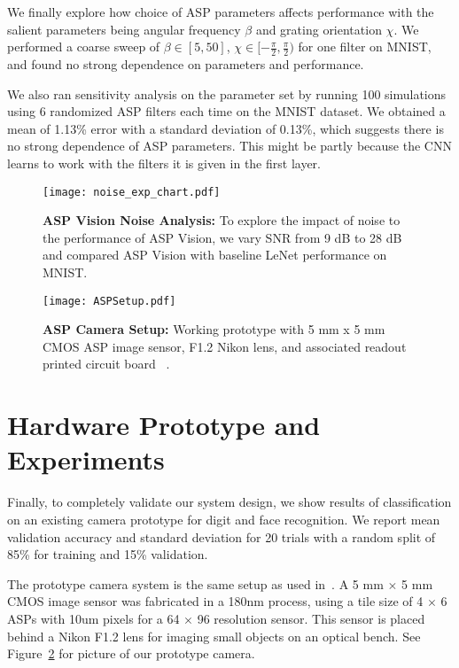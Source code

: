 \documentclass[10pt,twocolumn,letterpaper]{article}
\newcommand{\Section}[1]{\vspace{-4pt}\section{#1}\vspace{-4pt}}
\begin{document}
We finally explore how choice of ASP parameters affects performance with the salient parameters being angular frequency $\beta$ and grating orientation $\chi$. We performed a coarse sweep of $\beta \in [5, 50]$, $\chi \in [-\frac{\pi}{2}, \frac{\pi}{2})$ for one filter on MNIST, and found no strong dependence on parameters and performance. 

We also ran sensitivity analysis on the parameter set by running 100 simulations using 6 randomized ASP filters each time on the MNIST dataset. We obtained a mean of 1.13\% error with a standard deviation of 0.13\%, which suggests there is no strong dependence of ASP parameters. This might be partly because the CNN learns to work with the filters it is given in the first layer.  






\begin{figure}[t]
\begin{center}
   \texttt{[image: noise\_exp\_chart.pdf]}
\end{center}
   \caption{\textbf{ASP Vision Noise Analysis:} To explore the impact of noise to the performance of ASP Vision, we vary SNR from 9 dB to 28 dB and compared ASP Vision with baseline LeNet performance on MNIST.}
\label{fig:noisesweep}
\end{figure}

\begin{figure}[t]
\begin{center}
   \texttt{[image: ASPSetup.pdf]}
\end{center}
   \caption{\textbf{ASP Camera Setup:} Working prototype with 5 mm x 5 mm CMOS ASP image sensor, F1.2 Nikon lens, and associated readout printed circuit board ~\cite{hirsch2014switchable, wang2012compression}.}
\label{fig:aspsetup}
\end{figure}

\Section{Hardware Prototype and Experiments}
	Finally, to completely validate our system design, we show results of classification on an existing camera prototype for digit and face recognition. We report mean validation accuracy and standard deviation for 20 trials with a random split of 85\% for training and 15\% validation. 

The prototype camera system is the same setup as used in~\cite{hirsch2014switchable, wang2012compression}.  A 5 mm $\times$ 5 mm CMOS image sensor was fabricated in a 180nm process, using a tile size of 4 $\times$ 6 ASPs with 10um pixels for a 64 $\times$ 96 resolution sensor. This sensor is placed behind a Nikon F1.2 lens for imaging small objects on an optical bench. See Figure~\ref{fig:aspsetup} for picture of our prototype camera.
\end{document}
